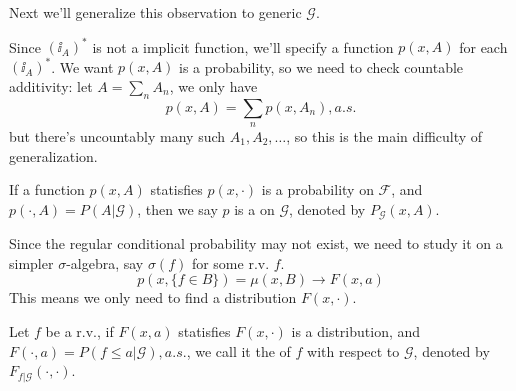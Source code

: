 Next we'll generalize this observation to generic $\mathscr{G}$.

Since $(\ii_A)^*$ is not a implicit function, we'll specify a function
$p(x, A)$ for each $(\ii_A)^*$.
We want $p(x, A)$ is a probability, so we need to check countable additivity:
let $A = \sum_{n} A_n$, we only have
\[
p(x, A) = \sum_{n} p(x, A_n), a.s.
\]
but there's uncountably many such $A_1, A_2, \dots$, so this
is the main difficulty of generalization.

\begin{definition}
	If a function $p(x, A)$ statisfies
	$p(x, \cdot)$ is a probability on $ \mathscr{F}$,
	and $p(\cdot, A) = P(A|\mathscr{G})$, then we say $p$ is
	a  on $ \mathscr{G}$,
	denoted by $P_{\mathscr{G}}(x, A)$.
\end{definition}

Since the regular conditional probability may not exist,
we need to study it on a simpler $\sigma$-algebra, say $\sigma(f)$ for
some r.v. $f$.
\[
p(x, \{f\in B\}) = \mu(x, B) \to F(x, a)
\]
This means we only need to find a distribution $F(x, \cdot)$.
\begin{definition}
	Let $f$ be a r.v., if $F(x, a)$ statisfies
	$F(x, \cdot)$ is a distribution, and $F(\cdot, a) = P(f\le a|\mathscr{G}), a.s.$,
	we call it the  of $f$
	with respect to $\mathscr{G}$, denoted by $F_{f|\mathscr{G}}(\cdot, \cdot)$.
\end{definition}

